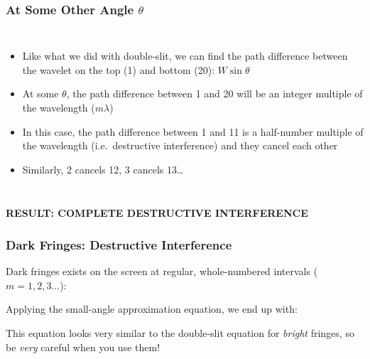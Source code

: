 \documentclass[compress,aspectratio=169]{beamer}
\newcommand{\eq}[2]{\vspace{#1}{\LARGE\begin{displaymath}#2\end{displaymath}}}
\begin{document}
\begin{frame}
  \frametitle{At Some Other Angle $\theta$}
  \begin{columns}
    
    \begin{itemize}
    \item Like what we did with double-slit, we can find the path
      difference between the wavelet on the top (1) and bottom
      (20): $W\sin\theta$
    \item At some $\theta$, the path difference between 1 and 20 will be an
      integer multiple of the wavelength ($m\lambda$)
    \item In this case, the path difference between 1 and 11 is
      a half-number multiple of the wavelength (i.e.\ destructive
      interference) and they cancel each other
    \item Similarly, 2 cancels 12, 3 cancels 13\ldots
    \end{itemize}

  \end{columns}

  \vspace{0.1in}\textbf{RESULT: COMPLETE DESTRUCTIVE INTERFERENCE}
\end{frame}


\begin{frame}
  \frametitle{Dark Fringes: Destructive Interference}
  Dark fringes exists on the screen at regular, whole-numbered intervals
  ($m=1,2,3\ldots$):

  \eq{-.2in}{
    \boxed{\pm m\lambda=W\sin\theta_m}
  }
  
  \vspace{-.1in}Applying the small-angle approximation equation, we end up with:

  \eq{-.2in}{
    \boxed{y_m=\frac{m\lambda L}{W}}
  }
  
  This equation looks very similar to the double-slit equation for
  \emph{bright} fringes, so be \emph{very} careful when you use them!
\end{frame}
\end{document}
